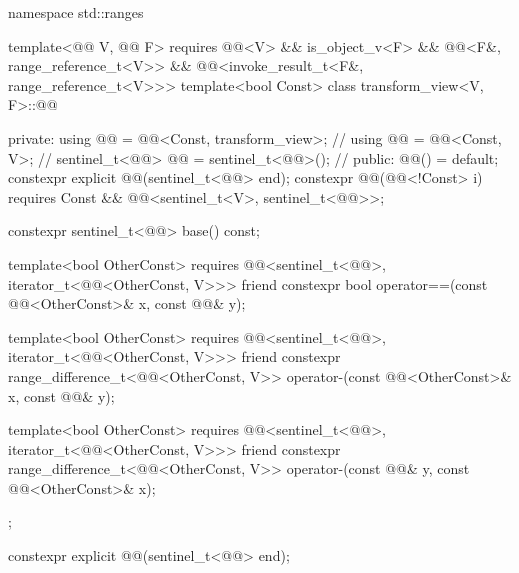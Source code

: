 %
\begin{codeblock}
namespace std::ranges {
  template<@@ V, @@ F>
    requires @@<V> && is_object_v<F> &&
             @@<F&, range_reference_t<V>> &&
             @@<invoke_result_t<F&, range_reference_t<V>>>
  template<bool Const>
  class transform_view<V, F>::@@ {
  private:
    using @@ = @@<Const, transform_view>;  // \expos
    using @@ = @@<Const, V>;                 // \expos
    sentinel_t<@@> @@ = sentinel_t<@@>();         // \expos
  public:
    @@() = default;
    constexpr explicit @@(sentinel_t<@@> end);
    constexpr @@(@@<!Const> i)
      requires Const && @@<sentinel_t<V>, sentinel_t<@@>>;

    constexpr sentinel_t<@@> base() const;

    template<bool OtherConst>
      requires @@<sentinel_t<@@>, iterator_t<@@<OtherConst, V>>>
    friend constexpr bool operator==(const @@<OtherConst>& x, const @@& y);

    template<bool OtherConst>
      requires @@<sentinel_t<@@>, iterator_t<@@<OtherConst, V>>>
    friend constexpr range_difference_t<@@<OtherConst, V>>
      operator-(const @@<OtherConst>& x, const @@& y);

    template<bool OtherConst>
      requires @@<sentinel_t<@@>, iterator_t<@@<OtherConst, V>>>
    friend constexpr range_difference_t<@@<OtherConst, V>>
      operator-(const @@& y, const @@<OtherConst>& x);
  };
}
\end{codeblock}

%
\begin{itemdecl}
constexpr explicit @@(sentinel_t<@@> end);
\end{itemdecl}

